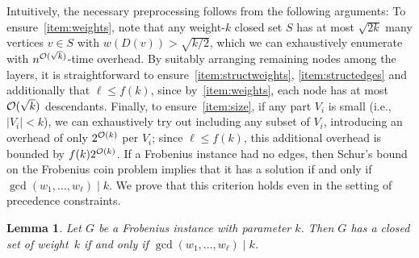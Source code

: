 \documentclass[10pt,a4paper]{article}
\theoremstyle{plain}
\newtheorem{lem}[thm]{Lemma}
\newcommand{\Oh}{{\cal O}}
\newcommand{\divides}{\mid}
\begin{document}
%
Intuitively, the necessary preprocessing follows from the following arguments: To ensure~\ref{item:weights}, note that any weight-$k$ closed set $S$ has at most $\sqrt{2k}$ many vertices $v\in S$ with $w(D(v)) > \sqrt{k/2}$, which we can exhaustively enumerate with $n^{\Oh(\sqrt{k})}$-time overhead. By suitably arranging remaining nodes among the layers, it is straightforward to ensure~\ref{item:structweights}, \ref{item:structedges} and additionally that $\ell \le f(k)$, since by~\ref{item:weights}, each node has at most $\Oh(\sqrt{k})$ descendants. Finally, to ensure~\ref{item:size}, if any part $V_i$ is small (i.e., $|V_i| < k$), we can exhaustively try out including any subset of $V_i$, introducing an overhead of only $2^{\Oh(k)}$ per $V_i$; since $\ell \le f(k)$, this additional overhead is bounded by $f(k)2^{\Oh(k)}$.  
%
%
%
%
%
If a Frobenius instance had no edges, then Schur's bound on the Frobenius coin problem implies that it has a solution if and only if $\gcd(w_1,\dots, w_\ell) \divides k$. We prove that this criterion holds even in the setting of precedence constraints.  
%
\begin{lem}\label{lem:Frobcrit}
Let $G$ be a Frobenius instance with  parameter $k$. Then $G$ has a closed set of weight~$k$ if and only if $\gcd(w_1,\dots, w_\ell) \divides k$.
\end{lem}
\end{document}
